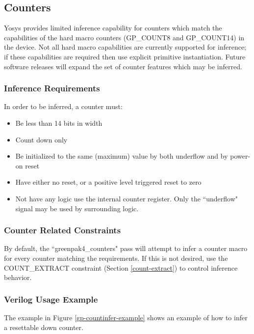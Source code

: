 \documentclass{article}
\begin{document}
\subsection{Counters}

Yosys provides limited inference capability for counters which match the capabilities of the hard macro counters 
(GP\_COUNT8 and GP\_COUNT14) in the device. Not all hard macro capabilities are currently supported for inference; if 
these capabilities are required then use explicit primitive instantiation. Future software releases will expand the set 
of counter features which may be inferred.

\subsubsection{Inference Requirements}

In order to be inferred, a counter must:

\begin{itemize}
\item Be less than 14 bits in width
\item Count down only
\item Be initialized to the same (maximum) value by both underflow and by power-on reset
\item Have either no reset, or a positive level triggered reset to zero
\item Not have any logic use the internal counter register. Only the ``underflow" signal may be used by surrounding logic.
\end{itemize}

\subsubsection{Counter Related Constraints}

By default, the ``greenpak4\_counters" pass will attempt to infer a counter macro for every counter matching the 
requirements. If this is not desired, use the COUNT\_EXTRACT constraint (Section \ref{count-extract}) to control 
inference behavior.

\clearpage
\subsubsection{Verilog Usage Example}

The example in Figure \ref{gp-countinfer-example} shows an example of how to infer a resettable down counter.
\end{document}
